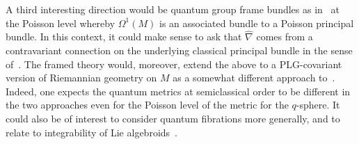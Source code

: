 \documentclass[pdftex]{sigma}
\numberwithin{equation}{section}
\newcommand{\<}{{\langle}}
\renewcommand{\>}{{\rangle}}
\begin{document}
 A third interesting direction would be quantum group frame bundles as in~\cite{Ma:non} at the Poisson level whereby $\Omega^1(M)$ is an associated bundle to a Poisson principal bundle. In this context, it could make sense to ask that $\hat\nabla$ comes from a contravariant connection on the underlying classical principal bundle in the sense of~\cite{Fer}. The framed theory would, moreover, extend the above to a PLG-covariant version of Riemannian geometry on $M$ as a somewhat different approach to~\cite{BegMa:prg}. Indeed, one expects the quantum metrics at semiclassical order to be different in the two approaches even for the Poisson level of the metric for the $q$-sphere. It could also be of interest to consider quantum fibrations more generally, and to relate to integrability of Lie algebroids~\cite{CraFer}.

\vspace{-2mm}
\end{document}
